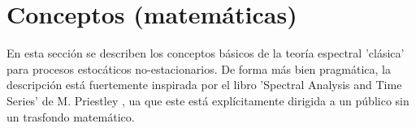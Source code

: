 
\section{Conceptos (matem\'aticas)}

En esta secci\'on se describen los conceptos b\'asicos de la teor\'ia espectral 'cl\'asica' para 
procesos estoc\'aticos no-estacionarios. 
De forma m\'as bien pragm\'atica, la descripci\'on est\'a
 fuertemente inspirada por el libro 'Spectral Analysis and Time Series' 
de M. Priestley \cite{Priestley81}, ua que este est\'a expl\'icitamente dirigida a un p\'ublico 
sin un trasfondo matem\'atico.

%
%


